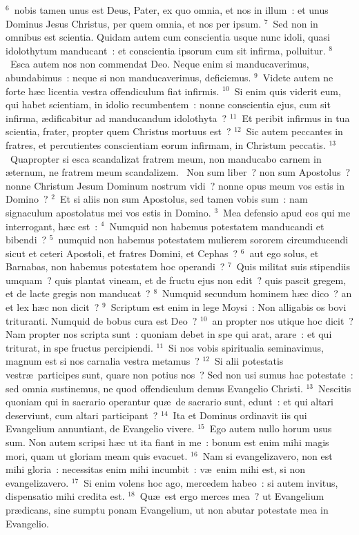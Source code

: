 ${}^{6}$~nobis tamen unus est Deus, Pater, ex quo omnia, et nos in illum~: et unus Dominus Jesus Christus, per quem omnia, et nos per ipsum.
${}^{7}$~Sed non in omnibus est scientia. Quidam autem cum conscientia usque nunc idoli, quasi idolothytum manducant~: et conscientia ipsorum cum sit infirma, polluitur.
${}^{8}$~Esca autem nos non commendat Deo. Neque enim si manducaverimus, abundabimus~: neque si non manducaverimus, deficiemus.
${}^{9}$~Videte autem ne forte h\ae c licentia vestra offendiculum fiat infirmis.
${}^{10}$~Si enim quis viderit eum, qui habet scientiam, in idolio recumbentem~: nonne conscientia ejus, cum sit infirma, \ae dificabitur ad manducandum idolothyta~?
${}^{11}$~Et peribit infirmus in tua scientia, frater, propter quem Christus mortuus est~?
${}^{12}$~Sic autem peccantes in fratres, et percutientes conscientiam eorum infirmam, in Christum peccatis.
${}^{13}$~Quapropter si esca scandalizat fratrem meum, non manducabo carnem in \ae ternum, ne fratrem meum scandalizem.
~Non sum liber~? non sum Apostolus~? nonne Christum Jesum Dominum nostrum vidi~? nonne opus meum vos estis in Domino~?
${}^{2}$~Et si aliis non sum Apostolus, sed tamen vobis sum~: nam signaculum apostolatus mei vos estis in Domino.
${}^{3}$~Mea defensio apud eos qui me interrogant, h\ae c est~:
${}^{4}$~Numquid non habemus potestatem manducandi et bibendi~?
${}^{5}$~numquid non habemus potestatem mulierem sororem circumducendi sicut et ceteri Apostoli, et fratres Domini, et Cephas~?
${}^{6}$~aut ego solus, et Barnabas, non habemus potestatem hoc operandi~?
${}^{7}$~Quis militat suis stipendiis umquam~? quis plantat vineam, et de fructu ejus non edit~? quis pascit gregem, et de lacte gregis non manducat~?
${}^{8}$~Numquid secundum hominem h\ae c dico~? an et lex h\ae c non dicit~?
${}^{9}$~Scriptum est enim in lege Moysi~: Non alligabis os bovi trituranti. Numquid de bobus cura est Deo~?
${}^{10}$~an propter nos utique hoc dicit~? Nam propter nos scripta sunt~: quoniam debet in spe qui arat, arare~: et qui triturat, in spe fructus percipiendi.
${}^{11}$~Si nos vobis spiritualia seminavimus, magnum est si nos carnalia vestra metamus~?
${}^{12}$~Si alii potestatis vestr\ae\ participes sunt, quare non potius nos~? Sed non usi sumus hac potestate~: sed omnia sustinemus, ne quod offendiculum demus Evangelio Christi.
${}^{13}$~Nescitis quoniam qui in sacrario operantur qu\ae\ de sacrario sunt, edunt~: et qui altari deserviunt, cum altari participant~?
${}^{14}$~Ita et Dominus ordinavit iis qui Evangelium annuntiant, de Evangelio vivere.
${}^{15}$~Ego autem nullo horum usus sum. Non autem scripsi h\ae c ut ita fiant in me~: bonum est enim mihi magis mori, quam ut gloriam meam quis evacuet.
${}^{16}$~Nam si evangelizavero, non est mihi gloria~: necessitas enim mihi incumbit~: v\ae\ enim mihi est, si non evangelizavero.
${}^{17}$~Si enim volens hoc ago, mercedem habeo~: si autem invitus, dispensatio mihi credita est.
${}^{18}$~Qu\ae\ est ergo merces mea~? ut Evangelium pr\ae dicans, sine sumptu ponam Evangelium, ut non abutar potestate mea in Evangelio.


